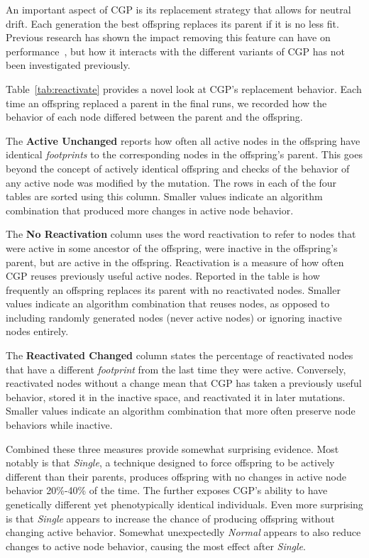 \documentclass[journal]{IEEEtran}
\begin{document}
An important aspect of CGP is its replacement strategy that allows for neutral drift.
Each generation the best offspring replaces its parent if it is no less fit.  Previous
research has shown the impact removing this feature can have on
performance~\cite{yu:2001:neutrality}, but how it interacts with the different variants
of CGP has not been investigated previously.

Table~\ref{tab:reactivate} provides a
novel look at CGP's replacement behavior.  Each time an offspring replaced a parent
in the final runs, we recorded how the behavior of each node differed between the
parent and the offspring.

The \textbf{Active Unchanged} reports how often all active nodes in the offspring
have identical \emph{footprints} to the corresponding nodes in the offspring's parent.
This goes beyond the concept of actively identical offspring and checks of the behavior
of any active node was modified by the mutation.  The rows in each of the four
tables are sorted using this column.  Smaller values indicate an algorithm
combination that produced more changes in active node behavior.

The \textbf{No Reactivation} column uses the word reactivation to refer to nodes
that were active in some ancestor of the offspring, were inactive in the offspring's
parent, but are active in the offspring.  Reactivation is a measure of how
often CGP reuses previously useful active nodes.  Reported in the table is how
frequently an offspring replaces its parent with no reactivated nodes.  Smaller
values indicate an algorithm combination that reuses nodes, as opposed to
including randomly generated nodes (never active nodes) or ignoring inactive nodes
entirely.

The \textbf{Reactivated Changed} column states the percentage of reactivated nodes
that have a different \emph{footprint} from the last time they were active.  Conversely,
reactivated nodes without a change mean that CGP has taken a previously useful behavior,
stored it in the inactive space, and reactivated it in later mutations.  Smaller values
indicate an algorithm combination that more often preserve node behaviors while
inactive.

Combined these three measures provide somewhat surprising evidence.  Most notably
is that \emph{Single}, a technique designed to force offspring to be actively different
than their parents, produces offspring with no changes in active node behavior
20\%-40\% of the time.  The further exposes CGP's ability to have genetically different
yet phenotypically identical individuals.  Even more surprising is that \emph{Single}
appears to increase the chance of producing offspring without changing active behavior.
Somewhat unexpectedly \emph{Normal} appears to also reduce changes to active node behavior,
causing the most effect after \emph{Single}.
\end{document}
